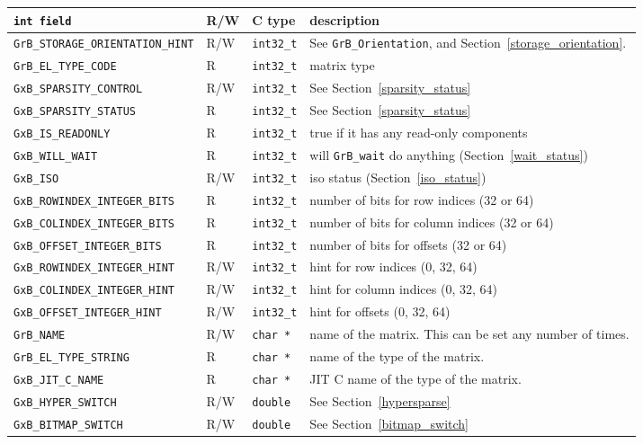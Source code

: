 \noindent
{\small
\begin{tabular}{|l|l|l|p{2.2in}|}
\hline
\verb'int field'                    & R/W  & C type        & description \\
\hline
\verb'GrB_STORAGE_ORIENTATION_HINT' & R/W  & \verb'int32_t'& See \verb'GrB_Orientation', \newline
                                                             and Section~\ref{storage_orientation}. \\
\verb'GrB_EL_TYPE_CODE'             & R    & \verb'int32_t'& matrix type \\
\verb'GxB_SPARSITY_CONTROL'         & R/W  & \verb'int32_t'& See Section~\ref{sparsity_status} \\
\verb'GxB_SPARSITY_STATUS'          & R    & \verb'int32_t'& See Section~\ref{sparsity_status} \\
\verb'GxB_IS_READONLY'              & R    & \verb'int32_t'& true if it has any read-only components \\
\verb'GxB_WILL_WAIT'                & R    & \verb'int32_t'& will \verb'GrB_wait' do anything (Section~\ref{wait_status}) \\ 
\verb'GxB_ISO'                      & R/W  & \verb'int32_t'& iso status (Section~\ref{iso_status}) \\
\verb'GxB_ROWINDEX_INTEGER_BITS'    & R    & \verb'int32_t'& number of bits for row indices (32 or 64) \\
\verb'GxB_COLINDEX_INTEGER_BITS'    & R    & \verb'int32_t'& number of bits for column indices (32 or 64) \\
\verb'GxB_OFFSET_INTEGER_BITS'      & R    & \verb'int32_t'& number of bits for offsets (32 or 64) \\
\verb'GxB_ROWINDEX_INTEGER_HINT'    & R/W  & \verb'int32_t'& hint for row indices (0, 32, 64) \\
\verb'GxB_COLINDEX_INTEGER_HINT'    & R/W  & \verb'int32_t'& hint for column indices (0, 32, 64) \\
\verb'GxB_OFFSET_INTEGER_HINT'      & R/W  & \verb'int32_t'& hint for offsets (0, 32, 64) \\
\hline
\verb'GrB_NAME'                     & R/W  & \verb'char *' & name of the matrix.
                                        This can be set any number of times. \\
\verb'GrB_EL_TYPE_STRING'           & R    & \verb'char *' & name of the type of the matrix. \\
\verb'GxB_JIT_C_NAME'               & R    & \verb'char *' & JIT C name of the type of the matrix. \\
\hline
\verb'GxB_HYPER_SWITCH'             & R/W  & \verb'double' & See Section~\ref{hypersparse} \\
\verb'GxB_BITMAP_SWITCH'            & R/W  & \verb'double' & See Section~\ref{bitmap_switch} \\
\hline
\end{tabular}
}

